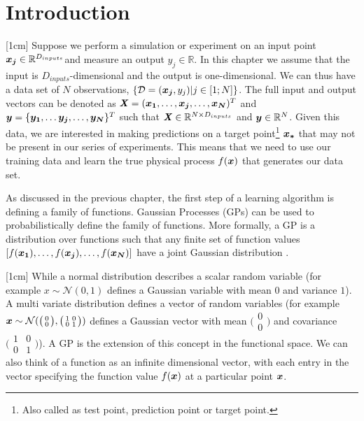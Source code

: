 
\section{Introduction}
[1cm]
Suppose we perform a simulation or experiment on an input point $\boldsymbol{x_{j}} \in \mathbb{R}^{D_{inputs}}$and measure an output $y_{j} \in \mathbb{R}$. In this chapter we assume that the input is $D_{inputs}$-dimensional and the output is one-dimensional. We can thus have a data set of $N$ observations, $\{\mathcal{D} = (\boldsymbol{x_{j}}, y_{j}) | j \in [1; N] \}$. The full input and output vectors can be denoted as $\bm{\mathit{X}} = (\boldsymbol{x_{1}}, \ldots , \boldsymbol{x_{j}}, \ldots, \boldsymbol{x_{N}})^T$ and $\boldsymbol{y} = \{\boldsymbol{y_{1}}, \ldots \boldsymbol{y_j}, \ldots, \boldsymbol{y_{N}}\}^T$ such that $\bm{\mathit{X}} \in \mathbb{R}^{N \times D_{inputs}}$ and $\boldsymbol{y} \in \mathbb{R}^{N }$. Given this data, we are interested in making predictions on a target point\footnote{Also called as test point, prediction point or target point.} $\boldsymbol{x_{*}}$ that may not be present in our series of experiments. This means that we need to use our training data and learn the true physical process $f(\boldsymbol{x})$ that generates our data set.

As discussed in the previous chapter, the first step of a learning algorithm is defining a family of functions. Gaussian Processes (GPs) can be used to probabilistically define the family of functions. More formally, a GP is a distribution over functions such that any finite set of function values $[f(\boldsymbol{x_{1}}), \ldots, f(\boldsymbol{x_{j}}), \ldots, f(\boldsymbol{x_{N}})]$ have a joint Gaussian distribution \cite{Rasmussen2005}. 

[1cm]
While a normal distribution describes a scalar random variable (for example $x \sim \mathcal{N}(0, 1)$ defines a Gaussian variable with mean $0$ and variance $1$). A multi variate distribution defines a vector of random variables (for example $\boldsymbol{x} \sim \mathcal{N}(\bigl( \begin{smallmatrix} 0\\ 0\end{smallmatrix}\bigr), \bigl( \begin{smallmatrix} 1 & 0\\ 0 & 1\end{smallmatrix}\bigr))$ defines a Gaussian vector with mean $\bigl( \begin{smallmatrix} 0\\ 0\end{smallmatrix}\bigr)$ and covariance $\bigl( \begin{smallmatrix} 1 & 0\\ 0 & 1\end{smallmatrix}\bigr)$). A GP is the extension of this concept in the functional space. We can also think of a function as an infinite dimensional vector, with each entry in the vector specifying the function value $f(\boldsymbol{x})$ at a particular point $\boldsymbol{x}$. 

